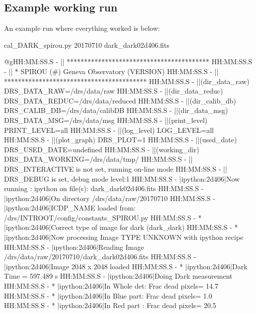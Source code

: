 \newpage
\subsection{Example working run}

An example run where everything worked is below:
\begin{cmdbox}[title={example}]
cal_DARK_spirou.py 20170710 dark_dark02d406.fits
\end{cmdbox}
\begin{cmdboxprintspecial}[fontupper=\tiny]
@gHH:MM:SS.S -   || ***************************************** 
HH:MM:SS.S -   || * SPIROU \@(#) Geneva Observatory (VERSION) 
HH:MM:SS.S -   || ***************************************** 
HH:MM:SS.S -   ||(dir_data_raw)      DRS_DATA_RAW=/drs/data/raw 
HH:MM:SS.S -   ||(dir_data_reduc)    DRS_DATA_REDUC=/drs/data/reduced 
HH:MM:SS.S -   ||(dir_calib_db)      DRS_CALIB_DB=/drs/data/calibDB 
HH:MM:SS.S -   ||(dir_data_msg)      DRS_DATA_MSG=/drs/data/msg 
HH:MM:SS.S -   ||(print_level)       PRINT_LEVEL=all         %
HH:MM:SS.S -   ||(log_level)         LOG_LEVEL=all         %
HH:MM:SS.S -   ||(plot_graph)        DRS_PLOT=1            %
HH:MM:SS.S -   ||(used_date)         DRS_USED_DATE=undefined
HH:MM:SS.S -   ||(working_dir)       DRS_DATA_WORKING=/drs/data/tmp/
HH:MM:SS.S -   ||                    DRS_INTERACTIVE is not set, running on-line mode
HH:MM:SS.S -   ||                    DRS_DEBUG is set, debug mode level:1
HH:MM:SS.S -   |ipython:2d406|Now running : ipython on file(s): dark_dark02d406.fits
HH:MM:SS.S -   |ipython:2d406|On directory /drs/data/raw/20170710
HH:MM:SS.S -   |ipython:2d406|ICDP_NAME loaded from: /drs/INTROOT/config/constants_SPIROU.py
HH:MM:SS.S - * |ipython:2d406|Correct type of image for dark (dark_dark)
HH:MM:SS.S - * |ipython:2d406|Now processing Image TYPE UNKNOWN with ipython recipe
HH:MM:SS.S -   |ipython:2d406|Reading Image /drs/data/raw/20170710/dark_dark02d406.fits
HH:MM:SS.S -   |ipython:2d406|Image 2048 x 2048 loaded
HH:MM:SS.S - * |ipython:2d406|Dark Time = 597.489 s
HH:MM:SS.S -   |ipython:2d406|Doing Dark measurement
HH:MM:SS.S - * |ipython:2d406|In Whole det: Frac dead pixels= 14.7 %
HH:MM:SS.S - * |ipython:2d406|In Blue part: Frac dead pixels= 1.0 %
HH:MM:SS.S - * |ipython:2d406|In Red part : Frac dead pixels= 20.5 %

\end{cmdboxprintspecial}
